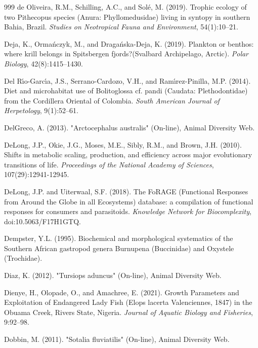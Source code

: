 \begin{thebibliography}{999}
de Oliveira, R.M., Schilling, A.C., and Sol{\'e}, M. (2019). Trophic ecology of two Pithecopus species (Anura: Phyllomedusidae) living in syntopy in southern Bahia, Brazil. \textit{Studies on Neotropical Fauna and Environment}, 54(1):10--21.

Deja, K., Orma{\'n}czyk, M., and Draga{\'n}ska-Deja, K. (2019). Plankton or benthos: where krill belongs in Spitsbergen fjords?(Svalbard Archipelago, Arctic). \textit{Polar Biology}, 42(8):1415--1430.

Del R{\'\i}o-Garc{\'\i}a, J.S., Serrano-Cardozo, V.H., and Ram{\'\i}rez-Pinilla, M.P. (2014). Diet and microhabitat use of Bolitoglossa cf. pandi (Caudata: Plethodontidae) from the Cordillera Oriental of Colombia. \textit{South American Journal of Herpetology}, 9(1):52--61.

DelGreco, A. (2013). "Arctocephalus australis" (On-line), {Animal Diversity Web}.

DeLong, J.P., Okie, J.G., Moses, M.E., Sibly, R.M., and Brown, J.H. (2010). Shifts in metabolic scaling, production, and efficiency across major evolutionary transitions of life. \textit{Proceedings of the National Academy of Sciences}, 107(29):12941-12945.

DeLong, J.P. and Uiterwaal, S.F. (2018). The {F}o{RAGE} ({F}unctional {R}esponses from {A}round the {G}lobe in all {E}cosystems) database: a compilation of functional responses for consumers and parasitoids. \textit{Knowledge Network for Biocomplexity}, doi:10.5063/F17H1GTQ.

Dempster, Y.L. (1995). Biochemical and morphological systematics of the Southern African gastropod genera Burnupena (Buccinidae) and Oxystele (Trochidae).

Diaz, K. (2012). "Tursiops aduncus" (On-line), {Animal Diversity Web}.

Dienye, H., Olopade, O., and Amachree, E. (2021). Growth Parameters and Exploitation of Endangered Lady Fish (Elops lacerta Valenciennes, 1847) in the Obuama Creek, Rivers State, Nigeria. \textit{Journal of Aquatic Biology and Fisheries}, 9:92--98.

Dobbin, M. (2011). "Sotalia fluviatilis" (On-line), {Animal Diversity Web}.


\end{thebibliography}
